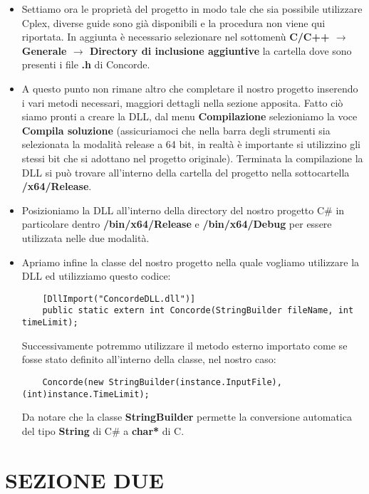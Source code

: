\documentclass[11pt]{article}
\begin{document}
\begin{itemize}
    \item Settiamo ora le proprietà del progetto in modo tale che sia possibile utilizzare Cplex, diverse guide sono già disponibili e la procedura non viene qui riportata. In aggiunta è necessario selezionare nel sottomenù \textbf{C/C++ $\rightarrow$ Generale $\rightarrow$ Directory di inclusione aggiuntive} la cartella dove sono presenti i file \textbf{.h} di Concorde. 
    
    \item A questo punto non rimane altro che completare il nostro progetto inserendo i vari metodi necessari, maggiori dettagli nella sezione apposita. Fatto ciò siamo pronti a creare la DLL, dal menu \textbf{Compilazione} selezioniamo la voce \textbf{Compila soluzione} (assicuriamoci che nella barra degli strumenti sia selezionata la modalità release a 64 bit, in realtà è importante si utilizzino gli stessi bit che si adottano nel progetto originale). Terminata la compilazione la DLL si può trovare all'interno della cartella del progetto nella sottocartella \textbf{/x64/Release}.
    
    \item Posizioniamo la DLL all'interno della directory del nostro progetto C\# in particolare dentro \textbf{/bin/x64/Release} e \textbf{/bin/x64/Debug} per essere utilizzata nelle due modalità.
    
    \item Apriamo infine la classe del nostro progetto nella quale vogliamo utilizzare la DLL ed utilizziamo questo codice:
    \begin{lstlisting}
    [DllImport("ConcordeDLL.dll")]
    public static extern int Concorde(StringBuilder fileName, int timeLimit);
    \end{lstlisting} 
    Successivamente potremmo utilizzare il metodo esterno importato come se fosse stato definito all'interno della classe, nel nostro caso:
    \begin{lstlisting}
    Concorde(new StringBuilder(instance.InputFile), (int)instance.TimeLimit);
    \end{lstlisting}
    Da notare che la classe \textbf{StringBuilder} permette la conversione automatica del tipo \textbf{String} di C\# a \textbf{char*} di C.
    
\end{itemize}

\section*{SEZIONE DUE}
\label{sec:SezioneDueS}
\end{document}
